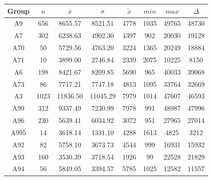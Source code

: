 \begin{figure}[ht!]
	\centering
	\begin{minipage}{0.5\textwidth}
		\tiny
		\setlength{\tabcolsep}{4pt}
		\centering
		\begin{tabular}{c|c|c|c|c|c|c|c}
			\toprule
			Group & $n$ & $\bar{x}$ & $\sigma$ & $\tilde{x}$ & $min$ & $max$ & $\Delta$ \\
			\midrule
			A9   & 656  & 8655.57  & 8521.51  & 4778 & 1035 & 49765 & 48730 \\ 
			A7   & 302  & 6238.63  & 4902.30  & 4397 & 902  & 20030 & 19128 \\ 
			A70  & 50   & 5729.56  & 4763.20  & 3224 & 1365 & 20249 & 18884 \\ 
			A71  & 10   & 3899.00  & 2746.84  & 2339 & 2075 & 10225 & 8150  \\ 
			A6   & 198  & 8421.67  & 8209.85  & 5690 & 965  & 40033 & 39068 \\ 
			A73  & 86   & 7717.21  & 7747.18  & 4813 & 1095 & 33764 & 32669 \\ 
			A3   & 1023 & 11836.50 & 11045.29 & 7979 & 1014 & 47607 & 46593 \\ 
			A99  & 312  & 9337.49  & 7230.99  & 7978 & 991  & 48987 & 47996 \\ 
			A96  & 230  & 5639.41  & 6034.92  & 3072 & 951  & 27965 & 27014 \\ 
			A995 & 14   & 3618.14  & 1331.10  & 4288 & 1613 & 4825  & 3212  \\ 
			A92  & 82   & 5758.10  & 3673.73  & 4544 & 999  & 16931 & 15932 \\ 
			A93  & 160  & 3530.39  & 3718.54  & 1926 & 99   & 22528 & 21829 \\ 
			A94  & 56   & 5849.05  & 3394.57  & 5785 & 1025 & 12582 & 11557 \\ 
			\bottomrule
		\end{tabular}
		\label{tbl:descriptives_arbis_matched_Strasse_SMax}
	\end{minipage}%
	\begin{minipage}{0.55\textwidth}
\end{minipage}
\end{figure}

